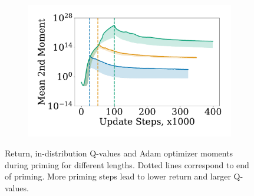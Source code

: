 \begin{figure}[t]
    \hfill
    \begin{subfigure}[b]{0.3\textwidth}
        \centering
        \includegraphics[width=\textwidth]{figures/dissecting/priming/priming_base_exp_avg_sq.pdf}
    \end{subfigure}%
    \caption{Return, in-distribution Q-values and Adam optimizer moments during priming for different lengths. Dotted lines correspond to end of priming. More priming steps lead to lower return and larger Q-values.}
    \label{fig:overestimation:priming_base}
\end{figure}

